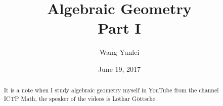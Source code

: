 \documentclass{amsart}
\theoremstyle{plain}
\theoremstyle{definition}
\theoremstyle{remark}
\numberwithin{equation}{section}
\begin{document}
\title[Complete-simple distributive lattices]
{Algebraic Geometry \\
	Part I}
\author{Wang Yunlei}
\date{June 19, 2017}
\begin{abstract}
It is a note when I study algebraic geometry myself in YouTube from the channel ICTP Math, the speaker of the videos is  Lothar G\"{o}ttsche.
\end{abstract}
\maketitle
\tableofcontents

 
\end{document}
